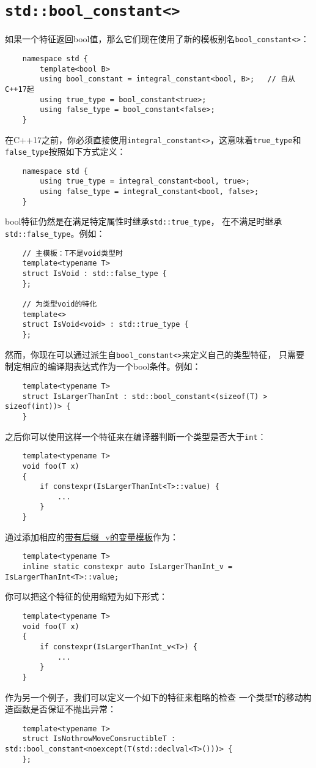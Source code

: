 \section{\texttt{std::bool\_constant<>}}\label{ch33.2}
如果一个特征返回bool值，那么它们现在使用了新的模板别名\texttt{bool\_constant<>}：
\begin{lstlisting}
    namespace std {
        template<bool B>
        using bool_constant = integral_constant<bool, B>;   // 自从C++17起
        using true_type = bool_constant<true>;
        using false_type = bool_constant<false>;
    }
\end{lstlisting}
在C++17之前，你必须直接使用\texttt{integral\_constant<>}，这意味着\texttt{true\_type}和
\texttt{false\_type}按照如下方式定义：
\begin{lstlisting}
    namespace std {
        using true_type = integral_constant<bool, true>;
        using false_type = integral_constant<bool, false>;
    }
\end{lstlisting}
bool特征仍然是在满足特定属性时继承\texttt{std::true\_type}，
在不满足时继承\texttt{std::false\_type}。例如：
\begin{lstlisting}
    // 主模板：T不是void类型时
    template<typename T>
    struct IsVoid : std::false_type {
    };

    // 为类型void的特化
    template<>
    struct IsVoid<void> : std::true_type {
    };
\end{lstlisting}
然而，你现在可以通过派生自\texttt{bool\_constant<>}来定义自己的类型特征，
只需要制定相应的编译期表达式作为一个bool条件。例如：
\begin{lstlisting}
    template<typename T>
    struct IsLargerThanInt : std::bool_constant<(sizeof(T) > sizeof(int))> {
    }
\end{lstlisting}
之后你可以使用这样一个特征来在编译器判断一个类型是否大于\texttt{int}：
\begin{lstlisting}
    template<typename T>
    void foo(T x)
    {
        if constexpr(IsLargerThanInt<T>::value) {
            ...
        }
    }
\end{lstlisting}
通过添加相应的\hyperref[ch21.1]{带有后缀\_v的变量模板}作为：
\begin{lstlisting}
    template<typename T>
    inline static constexpr auto IsLargerThanInt_v = IsLargerThanInt<T>::value;
\end{lstlisting}
你可以把这个特征的使用缩短为如下形式：
\begin{lstlisting}
    template<typename T>
    void foo(T x)
    {
        if constexpr(IsLargerThanInt_v<T>) {
            ...
        }
    }
\end{lstlisting}
作为另一个例子，我们可以定义一个如下的特征来粗略的检查
一个类型\texttt{T}的移动构造函数是否保证不抛出异常：
\begin{lstlisting}
    template<typename T>
    struct IsNothrowMoveConsructibleT : std::bool_constant<noexcept(T(std::declval<T>()))> {
    };
\end{lstlisting}


